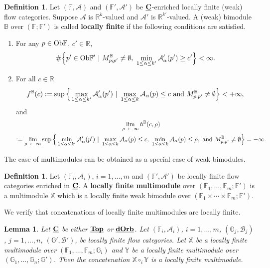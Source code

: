 \documentclass[reqno, 10pt]{amsart}
\numberwithin{equation}{section}
\numberwithin{equation}{section}
\newtheorem{lemma}[thm]{Lemma}
\theoremstyle{definition}
\newtheorem{defn}[thm]{Definition}
\theoremstyle{remark}
\newcommand{\beqn}{\begin{equation*}}
\newcommand{\eeqn}{\end{equation*}}
\newcommand{\mb}{\mathbb}
\newcommand{\mc}{\mathcal}
\newcommand{\uds}[1]{\underline{\smash{#1}}}
\begin{document}
\begin{defn}\label{defn_local_finite_bimodule}
Let $({\mb F}, {\mc A})$ and $({\mb F}', {\mc A}')$ be $\uds{\bf C}$-enriched locally finite (weak) flow categories. Suppose ${\mc A}$ is ${\mb R}^k$-valued and ${\mc A}'$ is ${\mb R}^{k'}$-valued.  A (weak) bimodule ${\mb B}$ over $({\mb F}; {\mb F}')$ is called {\bf locally finite} if the following conditions are satisfied.

\begin{enumerate}

\item For any $p \in {\rm Ob}{\mb F}$, $c' \in {\mb R}$,
\beqn
 \# \Big\{ p' \in {\rm Ob}{\mb F}'\ |\  M_{p;p'}^{\mb B}  \neq \emptyset,\ \min_{1 \leq \alpha \leq k' } {\mc A}_\alpha' (p') \geq c' \Big\} < \infty.
\eeqn


\item For all $c \in {\mb R}$
\beqn
f^{\mb B}(c):= \sup \Big\{ \max_{1 \leq \alpha \leq k'} {\mc A}_\alpha'(p')\ |\ \max_{1 \leq \alpha \leq k} {\mc A}_\alpha(p) \leq c\ {\rm and}\ M_{p;p'}^{\mb B} \neq \emptyset \Big\} < +\infty,
\eeqn
and
\begin{multline*}
\lim_{\rho \to -\infty} h^{\mb B}(c, \rho)\\
:=\lim_{\rho \to -\infty} \sup \Big\{ \min_{1 \leq \alpha \leq k'} {\mc A}_\alpha'(p')\ |\ \max_{1 \leq \alpha \leq k}{\mc A}_\alpha(p) \leq c,\ \min_{1 \leq \alpha \leq k} {\mc A}_\alpha(p) \leq \rho,\ {\rm and}\ M_{p;p'}^{\mb B} \neq \emptyset \Big\}  = -\infty.
\end{multline*}


\end{enumerate}
\end{defn}

The case of multimodules can be obtained as a special case of weak bimodules.

\begin{defn}\label{defn_Novikov_multimodule}
Let $({\mb F}_i, {\mc A}_i)$, $i=1, \ldots, m$ and $({\mb F}', {\mc A}')$ be locally finite flow categories enriched in $\uds{\bf C}$. A {\bf locally finite multimodule} over $({\mb F}_1, \ldots, {\mb F}_m; {\mb F}')$ is a multimodule ${\mb X}$ which is a locally finite weak bimodule over $({\mb F}_1\times \cdots \times {\mb F}_m; {\mb F}')$. 
\end{defn}


We verify that concatenations of locally finite multimodules are locally finite.

\begin{lemma}\label{lemma_concatenation_Novikov}
Let $\uds{\bf C}$ be either $\uds{\bf Top}$ or $\uds{\bf dOrb}$. Let $({\mb F}_i, {\mc A}_i)$, $i = 1, \ldots, m$, $({\mb G}_j, {\mc B}_j)$, $j = 1, \ldots, n$, $({\mb G}', {\mc B}')$, be locally finite flow categories. Let ${\mb X}$ be a locally finite multimodule over $({\mb F}_1, \ldots, {\mb F}_m; {\mb G}_i)$ and ${\mb Y}$ be a locally finite multimodule over $({\mb G}_1, \ldots, {\mb G}_n; {\mb G}')$. Then the concatenation ${\mb X} \circ_i {\mb Y}$ is a locally finite multimodule. 
\end{lemma}
\end{document}
